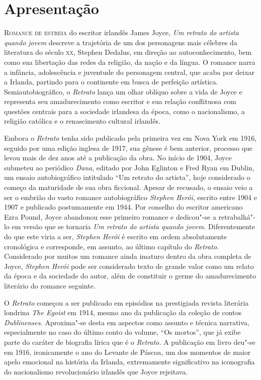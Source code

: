 \chapter[Apresentação, por Beatriz Kopschitz Bastos]{Apresentação}


\textsc{Romance de estreia} do escritor irlandês James Joyce, \textit{Um retrato do artista quando jovem} 
descreve a trajetória de um dos personagens mais célebres
da literatura do século \textsc{xx}, Stephen Dedalus, em direção ao autoconhecimento,
bem como sua libertação das redes da religião, da nação e da língua. O romance
narra a infância, adolescência e juventude do personagem central, que acaba por
deixar a Irlanda, partindo para o continente em busca de perfeição artística.
Semiautobiográfico, o \textit{Retrato} lança um olhar oblíquo sobre a vida de
Joyce e representa seu amadurecimento como escritor e sua relação conflituosa
com questões centrais para a sociedade irlandesa da época, como o nacionalismo,
a religião católica e o renascimento cultural irlandês. 

Embora o \textit{Retrato} tenha sido publicado pela primeira vez em Nova York
em 1916, seguido por uma edição inglesa de 1917, sua gênese é bem anterior,
processo que levou mais de dez anos até a publicação da obra. No início de
1904, Joyce submeteu ao periódico \textit{Dana}, editado por John Eglinton e
Fred Ryan em Dublin, um ensaio autobiográfico intitulado “Um retrato do
artista”, hoje considerado o começo da maturidade de sua obra ficcional.
Apesar de recusado, o ensaio veio a ser o embrião do vasto romance
autobiográfico \textit{Stephen Herói}, escrito entre 1904 e 1907 e publicado
postumamente em 1944. Por conselho do escritor americano Ezra Pound, Joyce
abandonou esse primeiro romance e dedicou"-se a retrabalhá"-lo em versão que se
tornaria \textit{Um} \textit{retrato do artista quando jovem.} Diferentemente
do que este viria a ser, \textit{Stephen Herói} é escrito em ordem
absolutamente cronológica e corresponde, em assunto, ao último capítulo do
\textit{Retrato}. Considerado por muitos um romance ainda imaturo dentro da
obra completa de Joyce, \textit{Stephen Herói} pode ser considerado texto de
grande valor como um relato da época e da sociedade do autor, além de
constituir o germe do amadurecimento literário do romance seguinte. 

O \textit{Retrato} começou a ser publicado em episódios na prestigiada revista
literária londrina \textit{The Egoist} em 1914, mesmo ano da publicação da
coleção de contos \textit{Dublinenses.} Aproxima"-se desta em aspectos como
assunto e técnica narrativa, especialmente no caso do último conto do volume,
“Os mortos”, que já exibe parte do caráter de biografia lírica que é o
\textit{Retrato.} A publicação em livro deu"-se em 1916, ironicamente o
ano do Levante de Páscoa, um dos momentos de maior apelo emocional na história
da Irlanda, extremamente significativo na iconografia do nacionalismo
revolucionário irlandês que Joyce rejeitava.

